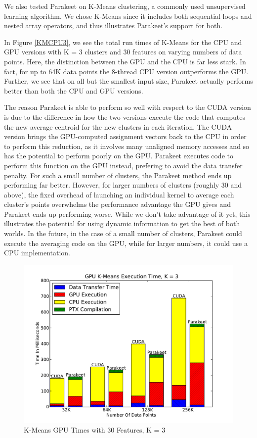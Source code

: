 \documentclass[10pt,twocolumn]{article}
\begin{document}
We also tested Parakeet on K-Means clustering, a commonly used unsupervised learning algorithm.  We chose K-Means since it includes both sequential loops and nested array operators, and thus illustrates Parakeet's support for both.

In Figure \ref{KMCPU3}, we see the total run times of K-Means for the CPU and GPU versions with K = 3 clusters and 30 features on varying numbers of data points.  Here, the distinction between the GPU and the CPU is far less stark.  In fact, for up to 64K data points the 8-thread CPU version outperforms the GPU.  Further, we see that on all but the smallest input size, Parakeet actually performs better than both the CPU and GPU versions.

The reason Parakeet is able to perform so well with respect to the CUDA version is due to the difference in how the two versions execute the code that computes the new average centroid for the new clusters in each iteration.  The CUDA version brings the GPU-computed assignment vectors back to the CPU in order to perform this reduction, as it involves many unaligned memory accesses and so has the potential to perform poorly on the GPU.  Parakeet executes code to perform this function on the GPU instead, prefering to avoid the data transfer penalty.  For such a small number of clusters, the Parakeet method ends up performing far better.  However, for larger numbers of clusters (roughly 30 and above), the fixed overhead of launching an individual kernel to average each cluster's points overwhelms the performance advantage the GPU gives and Parakeet ends up performing worse.  While we don't take advantage of it yet, this illustrates the potential for using dynamic information to get the best of both worlds.  In the future, in the case of a small number of clusters, Parakeet could execute the averaging code on the GPU, while for larger numbers, it could use a CPU implementation.

\begin{figure}
\includegraphics[scale=0.4]{KMGPU.pdf}
\caption{K-Means GPU Times with 30 Features, K = 3}
\label{KMGPU}
\end{figure}
\end{document}
